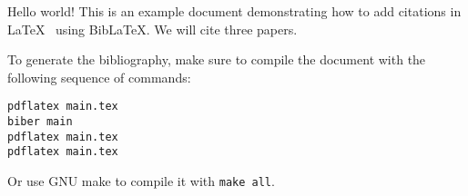 \documentclass{article}
\begin{document}
Hello world! This is an example document demonstrating how to add citations in LaTeX~\cite{knuth1984texbook} using BibLaTeX.
We will cite three papers.~\cite{lamport1986latex,goossens1993latex}

To generate the bibliography, make sure to compile the document with the following sequence of commands:

\begin{verbatim}
pdflatex main.tex
biber main
pdflatex main.tex
pdflatex main.tex
\end{verbatim}

Or use GNU make to compile it with \texttt{make all}.

\printbibliography
\end{document}
